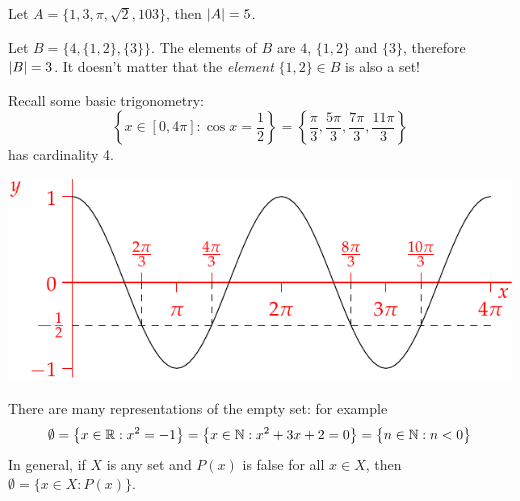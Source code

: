 \begin{examples}{}{}
	\exstart Let $A=\bigl\{1,3,\pi,\sqrt 2,103\bigr\}$, then $\left| A\right|=5$.
	\begin{enumerate}\setcounter{enumi}{1}
		\item Let $B=\bigl\{4,\{1,2\},\{3\}\bigr\}$. The elements of $B$ are $4$, $\{1,2\}$ and $\{3\}$, therefore $\left| B\right|=3$. It doesn't matter that the \emph{element} $\{1,2\}\in B$ is also a set!\par
		\begin{minipage}[t]{0.59\linewidth}\vspace{-5pt}
			\item Recall some basic trigonometry:
			\[
				\left\{x\in[0,4\pi]:\cos x=\frac 12\right\}=\left\{\frac{\pi}3,\frac{5\pi}3,\frac{7\pi}3,\frac{11\pi}3\right\}
			\]
			has cardinality 4.
		\end{minipage}
		\hfill
		\begin{minipage}[t]{0.4\linewidth}\vspace{-10pt}
			\flushright\includegraphics{sets-03-cos}
		\end{minipage}
		
		\item There are many representations of the empty set: for example
		\[
			\emptyset =\bigl\{x\in\mathbb{R}:x^2=-1\bigr\} = \bigl\{x\in\mathbb{N}:x^2+3x+2=0\bigr\}=\bigl\{n\in\mathbb{N}:n<0\bigr\}
		\]
		In general, if $X$ is any set and $P(x)$ is false for all $x\in X$, then\footnotemark{} $\emptyset=\bigl\{x\in X:P(x)\bigr\}$.
	\end{enumerate}
\end{examples}



